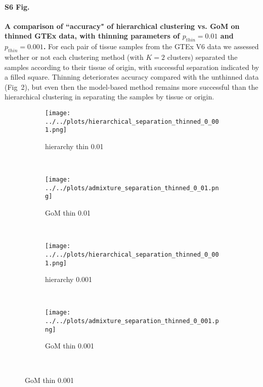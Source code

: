 \documentclass[10pt,letterpaper]{article}
\begin{document}
\paragraph*{S6 Fig.}
\label{figS6}
{\bf A comparison of ``accuracy" of hierarchical clustering vs. GoM on thinned GTEx data, with thinning parameters of $p_{thin}=0.01$ and $p_{thin}=0.001$.}  For each pair of tissue samples from the GTEx V6 data we assessed whether or not each clustering method (with $K=2$ clusters) separated the samples according to their tissue of origin, with successful separation indicated by a filled square. Thinning deteriorates accuracy compared with the unthinned data (Fig~2), but even then the model-based method remains more successful than the hierarchical clustering in separating the samples by tissue or origin.
 \begin{figure}[ht]
    \centering
     \begin{subfigure}[t]{0.5\textwidth}
        \centering
        \texttt{[image: ../../plots/hierarchical\_separation\_thinned\_0\_001.png]}
        \caption{hierarchy thin 0.01}
    \end{subfigure}%
    ~
    \begin{subfigure}[t]{0.5\textwidth}
        \centering
        \texttt{[image: ../../plots/admixture\_separation\_thinned\_0\_01.png]}
        \caption{GoM thin 0.01}
    \end{subfigure}\\

     \begin{subfigure}[t]{0.5\textwidth}
        \centering
        \texttt{[image: ../../plots/hierarchical\_separation\_thinned\_0\_001.png]}
        \caption{hierarchy 0.001}
    \end{subfigure}%
    ~
    \begin{subfigure}[t]{0.5\textwidth}
        \centering
        \texttt{[image: ../../plots/admixture\_separation\_thinned\_0\_001.png]}
        \caption{GoM thin 0.001}
    \end{subfigure}\\
\end{figure}
\end{document}
